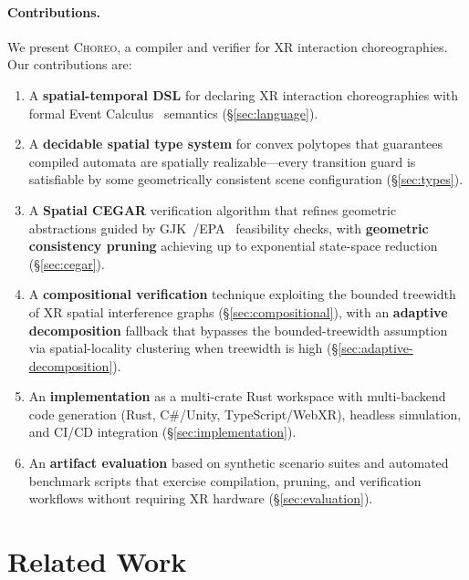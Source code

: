 \documentclass[11pt,a4paper]{article}
\begin{document}
\paragraph{Contributions.}
We present \textsc{Choreo}, a compiler and verifier for XR interaction choreographies.
Our contributions are:
\begin{enumerate}
  \item A \textbf{spatial-temporal DSL} for declaring XR interaction choreographies
        with formal Event Calculus~\cite{mueller2006,shanahan1999} semantics
        (\S\ref{sec:language}).
  \item A \textbf{decidable spatial type system} for convex polytopes that guarantees
        compiled automata are spatially realizable---every transition guard is
        satisfiable by some geometrically consistent scene configuration
        (\S\ref{sec:types}).
  \item A \textbf{Spatial CEGAR} verification algorithm that refines geometric
        abstractions guided by GJK~\cite{gjk1988}/EPA~\cite{epa2001} feasibility
        checks, with \textbf{geometric consistency pruning} achieving up to
        exponential state-space reduction (\S\ref{sec:cegar}).
  \item A \textbf{compositional verification} technique exploiting the bounded
        treewidth of XR spatial interference graphs (\S\ref{sec:compositional}),
        with an \textbf{adaptive decomposition} fallback that bypasses the
        bounded-treewidth assumption via spatial-locality clustering when
        treewidth is high (\S\ref{sec:adaptive-decomposition}).
  \item An \textbf{implementation} as a multi-crate Rust workspace with
        multi-backend code generation (Rust, C\#/Unity, TypeScript/WebXR),
        headless simulation, and CI/CD integration (\S\ref{sec:implementation}).
  \item An \textbf{artifact evaluation} based on synthetic scenario suites and
        automated benchmark scripts that exercise compilation, pruning, and
        verification workflows without requiring XR hardware
        (\S\ref{sec:evaluation}).
\end{enumerate}

\section{Related Work}\label{sec:related}
\end{document}
